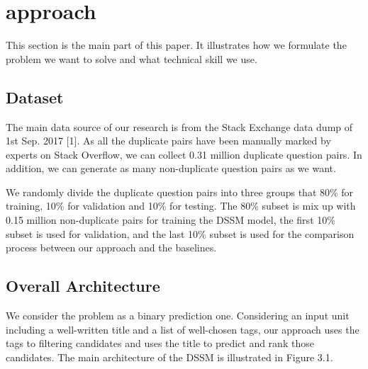 \chapter{approach}
	This section is the main part of this paper. It illustrates how we formulate the problem we want to solve and what technical skill we use.
	\section{Dataset}
	The main data source of our research is from the Stack Exchange data dump of  1st Sep. 2017 [1]. As all the duplicate pairs have been manually marked by experts on Stack Overflow, we can collect 0.31 million duplicate question pairs. In addition, we can generate as many non-duplicate question pairs as we want.  \par
	We randomly divide the duplicate question pairs into three groups that 80\% for training, 10\% for validation and 10\% for testing. The 80\% subset is mix up with 0.15 million non-duplicate pairs for training the DSSM model, the first 10\% subset is used for validation, and the last 10\% subset is used for the comparison process between our approach and the baselines. 
	
	\section{Overall Architecture}
	We consider the problem as a binary prediction one. Considering an input unit including a well-written title and a list of well-chosen tags, our approach uses the tags to filtering candidates and uses the title to predict and rank those candidates. The main architecture of the DSSM is illustrated in Figure 3.1. \par
	
